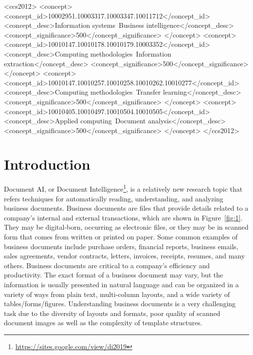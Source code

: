 \documentclass[sigconf]{acmart}
\begin{document}
\begin{CCSXML}
<ccs2012>
<concept>
<concept_id>10002951.10003317.10003347.10011712</concept_id>
<concept_desc>Information systems~Business intelligence</concept_desc>
<concept_significance>500</concept_significance>
</concept>
<concept>
<concept_id>10010147.10010178.10010179.10003352</concept_id>
<concept_desc>Computing methodologies~Information extraction</concept_desc>
<concept_significance>500</concept_significance>
</concept>
<concept>
<concept_id>10010147.10010257.10010258.10010262.10010277</concept_id>
<concept_desc>Computing methodologies~Transfer learning</concept_desc>
<concept_significance>500</concept_significance>
</concept>
<concept>
<concept_id>10010405.10010497.10010504.10010505</concept_id>
<concept_desc>Applied computing~Document analysis</concept_desc>
<concept_significance>500</concept_significance>
</concept>
</ccs2012>
\end{CCSXML}





\maketitle

\section{Introduction}

Document AI, or Document Intelligence\footnote{\url{https://sites.google.com/view/di2019}}, is a relatively new research topic that refers techniques for automatically reading, understanding, and analyzing business documents. Business documents are files that provide details related to a company's internal and external transactions, which are shown in Figure~\ref{fig:1}. They may be digital-born, occurring as electronic files, or they may be in scanned form that comes from written or printed on paper. Some common examples of business documents include purchase orders, financial reports, business emails, sales agreements, vendor contracts, letters, invoices, receipts, resumes, and many others. Business documents are critical to a company's efficiency and productivity. The exact format of a business document may vary, but the information is usually presented in natural language and can be organized in a variety of ways from plain text, multi-column layouts, and a wide variety of tables/forms/figures. Understanding business documents is a very challenging task due to the diversity of layouts and formats, poor quality of scanned document images as well as the complexity of template structures.
\end{document}
